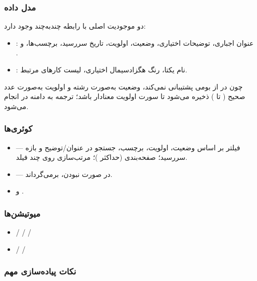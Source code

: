 \subsubsection*{ مدل داده}

دو موجودیت اصلی با رابطه چندبه‌چند وجود دارد:

\begin{itemize}
    \item {:} عنوان اجباری، توضیحات اختیاری، وضعیت، اولویت، تاریخ سررسید، برچسب‌ها،  و .
    \item {:} نام یکتا، رنگ هگزادسیمال اختیاری، لیست کارهای مرتبط.
\end{itemize}

چون  در  از  بومی پشتیبانی نمی‌کند، وضعیت به‌صورت رشته و اولویت به‌صورت عدد صحیح ( تا ) ذخیره می‌شود تا سورت اولویت معنادار باشد؛ ترجمه به  دامنه در  انجام می‌شود.


\subsubsection*{کوئری‌ها}
\begin{itemize}
    \item {} — فیلتر بر اساس وضعیت، اولویت، برچسب، جستجو در عنوان/توضیح و بازه سررسید؛ صفحه‌بندی  (حداکثر )؛ مرتب‌سازی روی چند فیلد.
    \item {} — در صورت نبودن،  برمی‌گرداند.
    \item {} و .
\end{itemize}

\subsubsection*{میوتیشن‌ها}
\begin{itemize}
    \item {} /  /  / 
    \item {} /  / 
\end{itemize}

\subsubsection*{ نکات پیاده‌سازی مهم}

